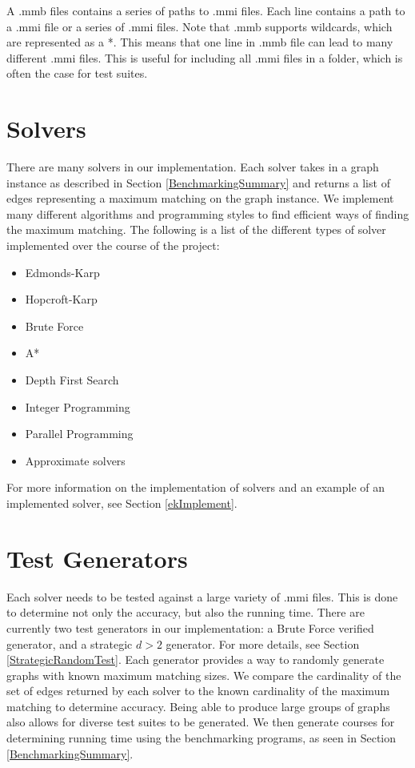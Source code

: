 A .mmb files contains a series of paths to .mmi files. Each line contains a path to 
a .mmi file or a series of .mmi files. Note that .mmb supports wildcards, which are
represented as a *. This means that one line in .mmb file can lead to many 
different .mmi files. This is useful for including all .mmi files in a folder,
which is often the case for test suites. 

\section{Solvers} \label{SolverSummary}
There are many solvers in our implementation. Each solver takes in a graph instance
as described in Section \ref{BenchmarkingSummary} and returns a list of edges representing
a maximum matching on the graph instance. We implement many different algorithms and 
programming styles to find efficient ways of finding the maximum matching. 
The following is a list of the
different types of solver implemented over the course of the project:
\begin{itemize}
    \item Edmonds-Karp 
    \item Hopcroft-Karp
    \item Brute Force
    \item A*
    \item Depth First Search
    \item Integer Programming
    \item Parallel Programming
    \item Approximate solvers
\end{itemize}
For more information on the implementation of solvers and an example of an implemented solver,
see Section \ref{ekImplement}.

\section{Test Generators}
Each solver needs to be tested against a large variety of .mmi files. This is
done to determine not only the accuracy, but also the running time. There are 
currently two test generators in our implementation: a Brute Force verified 
generator, and a strategic $d > 2$ generator. For more details, see Section \ref{StrategicRandomTest}. Each generator provides
a way to randomly generate graphs with known maximum matching sizes. We compare 
the cardinality of the set of edges returned by each solver to the known cardinality of
the maximum matching to
determine accuracy. Being able to produce large groups of graphs also allows for 
diverse test suites to be generated. We then generate courses
for determining running time using the benchmarking programs, as seen in 
Section \ref{BenchmarkingSummary}. 

